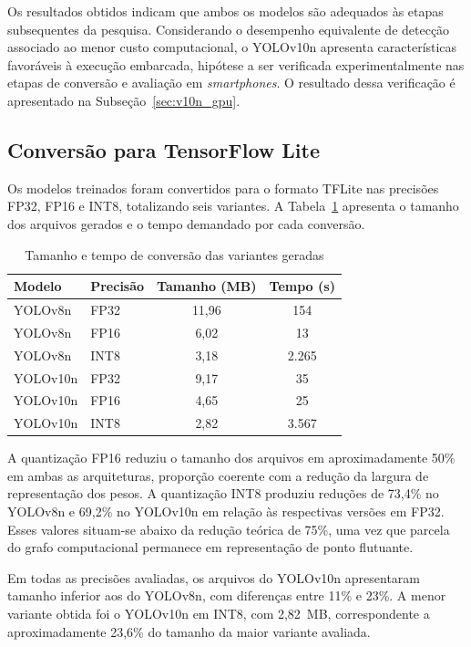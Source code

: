\documentclass[artigo,times,capa]{iftex2024}
\begin{document}
Os resultados obtidos indicam que ambos os modelos são adequados às etapas
subsequentes da pesquisa. Considerando o desempenho equivalente de detecção
associado ao menor custo computacional, o YOLOv10n apresenta características
favoráveis à execução embarcada, hipótese a ser verificada experimentalmente nas
etapas de conversão e avaliação em \textit{smartphones}. O resultado dessa
verificação é apresentado na Subseção~\ref{sec:v10n_gpu}.

\subsection{Conversão para TensorFlow Lite}

Os modelos treinados foram convertidos para o formato \ac{TFLite} nas precisões \ac{FP32}, \ac{FP16} e \ac{INT8}, totalizando seis variantes. A Tabela~\ref{tab:tamanhos_tflite} apresenta o tamanho dos arquivos gerados e o tempo demandado por cada conversão.

\begin{table}[H]
\centering
\caption{Tamanho e tempo de conversão das variantes geradas}
\label{tab:tamanhos_tflite}
\begin{tabular}{llcc}
\toprule
\textbf{Modelo} & \textbf{Precisão} & \textbf{Tamanho (MB)} & \textbf{Tempo (s)} \\
\midrule
YOLOv8n  & \ac{FP32} & 11,96 & 154 \\
YOLOv8n  & \ac{FP16} & 6,02  & 13 \\
YOLOv8n  & \ac{INT8} & 3,18  & 2.265 \\
YOLOv10n & \ac{FP32} & 9,17  & 35 \\
YOLOv10n & \ac{FP16} & 4,65  & 25 \\
YOLOv10n & \ac{INT8} & 2,82  & 3.567 \\
\bottomrule
\end{tabular}
\end{table}

A quantização \ac{FP16} reduziu o tamanho dos arquivos em aproximadamente 50\% em ambas as arquiteturas, proporção coerente com a redução da largura de representação dos pesos. A quantização \ac{INT8} produziu reduções de 73,4\% no YOLOv8n e 69,2\% no YOLOv10n em relação às respectivas versões em \ac{FP32}. Esses valores situam-se abaixo da redução teórica de 75\%, uma vez que parcela do grafo computacional permanece em representação de ponto flutuante.

Em todas as precisões avaliadas, os arquivos do YOLOv10n apresentaram tamanho inferior aos do YOLOv8n, com diferenças entre 11\% e 23\%. A menor variante obtida foi o YOLOv10n em \ac{INT8}, com 2,82~MB, correspondente a aproximadamente 23,6\% do tamanho da maior variante avaliada.
\end{document}
